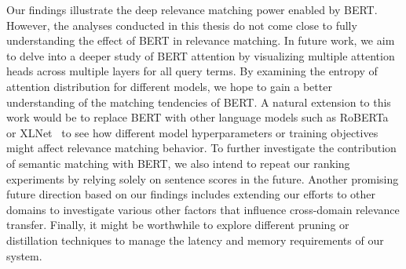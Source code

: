 Our findings illustrate the deep relevance matching power enabled by BERT.
However, the analyses conducted in this thesis do not come close to fully understanding the effect of BERT in relevance matching.
In future work, we aim to delve into a deeper study of BERT attention by visualizing multiple attention heads across multiple layers for all query terms.
By examining the entropy of attention distribution for different models, we hope to gain a better understanding of the matching tendencies of BERT.
A natural extension to this work would be to replace BERT with other language models such as RoBERTa~\cite{DBLP:journals/corr/abs-1907-11692} or XLNet~\cite{DBLP:journals/corr/abs-1906-08237} to see how different model hyperparameters or training objectives might affect relevance matching behavior.
To further investigate the contribution of semantic matching with BERT, we also intend to repeat our ranking experiments by relying solely on sentence scores in the future.
Another promising future direction based on our findings includes extending our efforts to other domains to investigate various other factors that influence cross-domain relevance transfer.
Finally, it might be worthwhile to explore different pruning or distillation techniques to manage the latency and memory requirements of our system.